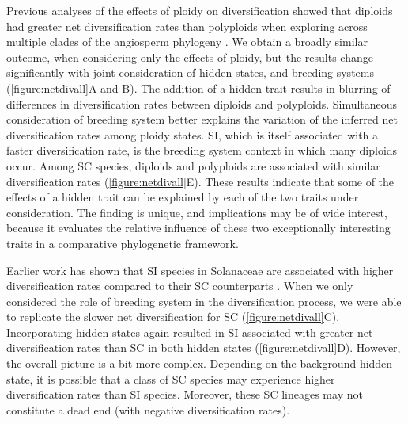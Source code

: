 Previous analyses of the effects of ploidy on diversification showed that diploids had greater net diversification rates than polyploids when exploring across multiple clades of the angiosperm phylogeny \citet{mayrose_2011, mayrose_2015}. 
We obtain a broadly similar outcome, when considering only the effects of ploidy, but the results change significantly with joint consideration of hidden states, and breeding systems (\cref{figure:netdivall}A and B). 
The addition of a hidden trait results in blurring of differences in diversification rates between diploids and polyploids.
Simultaneous consideration of breeding system better explains the variation of the inferred net diversification rates among ploidy states. 
SI, which is itself associated with a faster diversification rate, is the breeding system context in which many diploids occur.
Among SC species, diploids and polyploids are associated with similar diversification rates (\cref{figure:netdivall}E).
These results indicate that some of the effects of a hidden trait can be explained by each of the two traits under consideration. 
The finding is unique, and implications may be of wide interest, because it evaluates the relative influence of these two exceptionally interesting traits in a comparative phylogenetic framework.

Earlier work has shown that SI species in Solanaceae are associated with higher diversification rates compared to their SC counterparts \citep{goldberg_2010}. 
When we only considered the role of breeding system in the diversification process, we were able to replicate the slower net diversification for SC  (\cref{figure:netdivall}C).  %
Incorporating hidden states again resulted in SI associated with greater net diversification rates than SC in both hidden states  (\cref{figure:netdivall}D). 
However, the overall picture is a bit more complex.
Depending on the background hidden state, it is possible that a class of SC species may experience higher diversification rates than SI species.
Moreover, these SC lineages may not constitute a dead end (with negative diversification rates).




